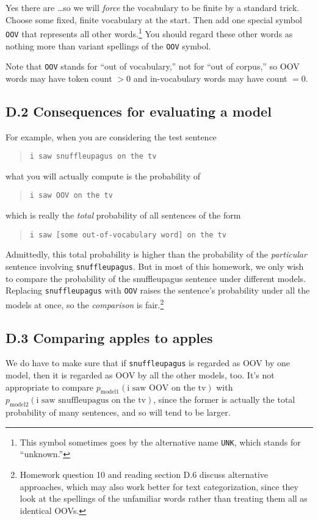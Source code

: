 Yes there are \ldots so we will \textit{force} the vocabulary to be finite by a standard trick. Choose some fixed, finite vocabulary at the start. Then add one special symbol \texttt{OOV} that represents all other words.\footnote{This symbol sometimes goes by the alternative name \texttt{UNK}, which stands for “unknown.”} You should regard these other words as nothing more than variant spellings of the \texttt{OOV} symbol.

Note that \texttt{OOV} stands for “out of vocabulary,” not for “out of corpus,” so OOV words may have token count $> 0$ and in-vocabulary words may have count $= 0$.

\subsection*{D.2 Consequences for evaluating a model}
For example, when you are considering the test sentence
\begin{quote}
\texttt{i saw snuffleupagus on the tv}
\end{quote}
what you will actually compute is the probability of
\begin{quote}
\texttt{i saw OOV on the tv}
\end{quote}
which is really the \textit{total} probability of all sentences of the form
\begin{quote}
\texttt{i saw [some out-of-vocabulary word] on the tv}
\end{quote}

Admittedly, this total probability is higher than the probability of the \textit{particular} sentence involving \texttt{snuffleupagus}. But in most of this homework, we only wish to compare the probability of the snuffleupagus sentence under different models. Replacing \texttt{snuffleupagus} with \texttt{OOV} raises the sentence’s probability under all the models at once, so the \textit{comparison} is fair.\footnote{Homework question 10 and reading section D.6 discuss alternative approaches, which may also work better for text categorization, since they look at the spellings of the unfamiliar words rather than treating them all as identical OOVs.}

\subsection*{D.3 Comparing apples to apples}

We do have to make sure that if \texttt{snuffleupagus} is regarded as OOV by one model, then it is regarded as OOV by all the other models, too. It’s not appropriate to compare $p_{\text{model1}}(\text{i saw OOV on the tv})$ with $p_{\text{model2}}(\text{i saw snuffleupagus on the tv})$, since the former is actually the total probability of many sentences, and so will tend to be larger.

